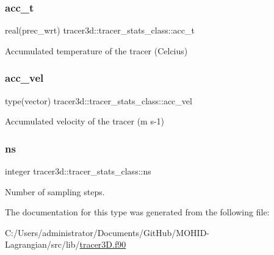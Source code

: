 \subsubsection{\texorpdfstring{acc\+\_\+t}{acc\_t}}
{\footnotesize\ttfamily real(prec\+\_\+wrt) tracer3d\+::tracer\+\_\+stats\+\_\+class\+::acc\+\_\+t\hspace{0.3cm}{\ttfamily [private]}}



Accumulated temperature of the tracer (Celcius) 

\mbox{\label{structtracer3d_1_1tracer__stats__class_a623f27a49b6e37a3e5c21b8bab55a323}} 
\subsubsection{\texorpdfstring{acc\+\_\+vel}{acc\_vel}}
{\footnotesize\ttfamily type(vector) tracer3d\+::tracer\+\_\+stats\+\_\+class\+::acc\+\_\+vel\hspace{0.3cm}{\ttfamily [private]}}



Accumulated velocity of the tracer (m s-\/1) 

\mbox{\label{structtracer3d_1_1tracer__stats__class_a0a07132ada5734cd6f132bc9ffd327b2}} 
\subsubsection{\texorpdfstring{ns}{ns}}
{\footnotesize\ttfamily integer tracer3d\+::tracer\+\_\+stats\+\_\+class\+::ns\hspace{0.3cm}{\ttfamily [private]}}



Number of sampling steps. 



The documentation for this type was generated from the following file\+:\begin{DoxyCompactItemize}
\item 
C\+:/\+Users/administrator/\+Documents/\+Git\+Hub/\+M\+O\+H\+I\+D-\/\+Lagrangian/src/lib/\mbox{\hyperlink{tracer3_d_8f90}{tracer3\+D.\+f90}}\end{DoxyCompactItemize}
